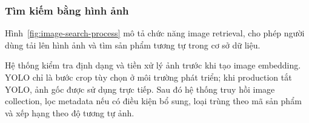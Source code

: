 \begin{minipage}{\textwidth}

\label{fig:text-search-process}
\end{minipage}
\par\medskip


\par\medskip\noindent
\begin{minipage}{\textwidth}
\subsubsection{Tìm kiếm bằng hình ảnh}

Hình~\ref{fig:image-search-process} mô tả chức năng image retrieval, cho phép người dùng tải lên hình ảnh và tìm sản phẩm tương tự trong cơ sở dữ liệu.

Hệ thống kiểm tra định dạng và tiền xử lý ảnh trước khi tạo image embedding. YOLO chỉ là bước crop tùy chọn ở môi trường phát triển; khi production tắt YOLO, ảnh gốc được sử dụng trực tiếp. Sau đó hệ thống truy hồi image collection, lọc metadata nếu có điều kiện bổ sung, loại trùng theo mã sản phẩm và xếp hạng theo độ tương tự ảnh.






\end{minipage}
